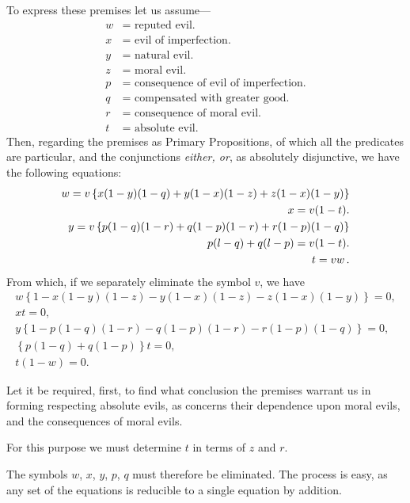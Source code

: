 \documentclass[oneside]{book}
\begin{document}
To express these premises let us assume---
\begin{align*}
  w &= \text{ reputed evil.}                         \\
  x &= \text{ evil of imperfection.}                 \\
  y &= \text{ natural evil.}                         \\
  z &= \text{ moral evil.}                           \\
  p &= \text{ consequence of evil of imperfection.}  \\
  q &= \text{ compensated with greater good.}        \\
  r &= \text{ consequence of moral evil.}            \\
  t &= \text{ absolute evil.}
\end{align*}
Then, regarding the premises as Primary Propositions, of which
all the predicates are particular, and the conjunctions \emph{either, or},
as absolutely disjunctive, we have the following equations:
\begin{eqnarray*}
 w = v\left\{x(1-y)(1-q) + y(1-x)(1-z) + z(1-x)(1-y)\right\} \hfill\\
\hfill x = v(1 - t).\\
%
y = v \left\{p (1-q)(1-r) + q (1-p)(1-r) + r(1-p)(1-q)\right\}\hfill\\
\hfill p(l-q) + q(l-p) = v(1-t).\\
t = vw\,.
\end{eqnarray*}
From which, if we separately eliminate the symbol $v$, we have
\setcounter{equation}{0}
\begin{eqnarray}
w\left\{
   1 - x(1-y)(1-z) - y(1-x)(1-z) - z(1-x)(1-y)
 \right\} =0,  \\
xt = 0,        \\
y\left\{
   1 - p(1-q)(1-r) - q(1-p)(1-r) - r(1-p)(1-q)
 \right\} =0,  \\
\left\{ p(1-q) + q(1-p)\right\}t = 0,\\
t(1-w) = 0.
\end{eqnarray}

Let it be required, first, to find what conclusion the premises
warrant us in forming respecting absolute evils, as concerns their
dependence upon moral evils, and the consequences of moral
evils.

For this purpose we must determine $t$ in terms of $z$ and $r$.

The symbols $w$, $x$, $y$, $p$, $q$ must therefore be eliminated. The
process is easy, as any set of the equations is reducible to a single
equation by addition.
\end{document}

